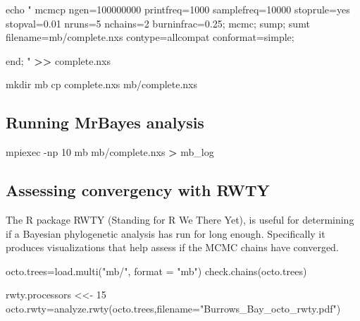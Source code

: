 \documentclass[
]{article}
\newenvironment{Shaded}{\begin{snugshade}}{\end{snugshade}}
\newcommand{\AttributeTok}[1]{\textcolor[rgb]{0.77,0.63,0.00}{#1}}
\newcommand{\BuiltInTok}[1]{#1}
\newcommand{\DecValTok}[1]{\textcolor[rgb]{0.00,0.00,0.81}{#1}}
\newcommand{\ExtensionTok}[1]{#1}
\newcommand{\FunctionTok}[1]{\textcolor[rgb]{0.00,0.00,0.00}{#1}}
\newcommand{\NormalTok}[1]{#1}
\newcommand{\OperatorTok}[1]{\textcolor[rgb]{0.81,0.36,0.00}{\textbf{#1}}}
\newcommand{\OtherTok}[1]{\textcolor[rgb]{0.56,0.35,0.01}{#1}}
\newcommand{\StringTok}[1]{\textcolor[rgb]{0.31,0.60,0.02}{#1}}
\begin{document}
\begin{Shaded}
\begin{Highlighting}[]
\BuiltInTok{echo} \StringTok{"}
\StringTok{      mcmcp ngen=100000000 printfreq=1000 samplefreq=10000 stoprule=yes stopval=0.01 nruns=5 nchains=2 burninfrac=0.25;}
\StringTok{      mcmc;}
\StringTok{      sump;}
\StringTok{      sumt filename=mb/complete.nxs contype=allcompat conformat=simple;}

\StringTok{end;}
\StringTok{"} \OperatorTok{\textgreater{}\textgreater{}}\NormalTok{ complete.nxs}

\FunctionTok{mkdir}\NormalTok{ mb}
\FunctionTok{cp}\NormalTok{ complete.nxs mb/complete.nxs}
\end{Highlighting}
\end{Shaded}

\hypertarget{running-mrbayes-analysis}{%
\subsection{Running MrBayes analysis}\label{running-mrbayes-analysis}}

\begin{Shaded}
\begin{Highlighting}[]
\ExtensionTok{mpiexec} \AttributeTok{{-}np}\NormalTok{ 10 mb mb/complete.nxs }\OperatorTok{\textgreater{}}\NormalTok{ mb\_log}
\end{Highlighting}
\end{Shaded}

\hypertarget{assessing-convergency-with-rwty}{%
\subsection{Assessing convergency with
RWTY}\label{assessing-convergency-with-rwty}}

The R package RWTY (Standing for R We There Yet), is useful for
determining if a Bayesian phylogenetic analysis has run for long enough.
Specifically it produces visualizations that help assess if the MCMC
chains have converged.

\begin{Shaded}
\begin{Highlighting}[]
\NormalTok{octo.trees}\OtherTok{=}\FunctionTok{load.multi}\NormalTok{(}\StringTok{"mb/"}\NormalTok{, }\AttributeTok{format =} \StringTok{"mb"}\NormalTok{)}
\FunctionTok{check.chains}\NormalTok{(octo.trees)}
\end{Highlighting}
\end{Shaded}

\begin{Shaded}
\begin{Highlighting}[]
\NormalTok{rwty.processors }\OtherTok{\textless{}\textless{}{-}} \DecValTok{15}
\NormalTok{octo.rwty}\OtherTok{=}\FunctionTok{analyze.rwty}\NormalTok{(octo.trees,}\AttributeTok{filename=}\StringTok{"Burrows\_Bay\_octo\_rwty.pdf"}\NormalTok{)}
\end{Highlighting}
\end{Shaded}
\end{document}

